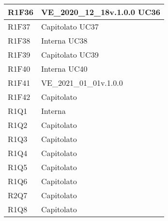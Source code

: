 \begin{center}
\begin{longtable}{|p{22mm}|p{44mm}|}
R1F36 &
VE\_2020\_12\_18v.1.0.0 \newline
UC36 \newline
\\
\hline

R1F37 &
Capitolato \newline
UC37 \newline
\\
\hline

R1F38 &
Interna \newline
UC38 \newline
\\
\hline

R1F39 &
Capitolato \newline
UC39 \newline
\\
\hline

R1F40 &
Interna \newline
UC40 \newline
\\
\hline

R1F41 &
VE\_2021\_01\_01v.1.0.0 \newline
\\
\hline

R1F42 &
Capitolato \newline
\\
\hline

 R1Q1 &
Interna \newline
\\
\hline

R1Q2 &
Capitolato \newline
\\
\hline

R1Q3 &
Capitolato \newline
\\
\hline

R1Q4 &
Capitolato \newline
\\
\hline

R1Q5 &
Capitolato \newline
\\
\hline

R1Q6 &
Capitolato \newline
\\
\hline

R2Q7 &
Capitolato \newline
\\
\hline

R1Q8 &
Capitolato \newline
\\
\hline


\end{longtable}
\end{center}
